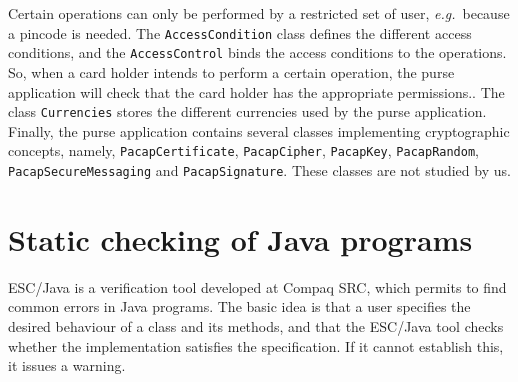 \documentclass[a4paper]{llncs}
\begin{document}

Certain operations can only be performed by a restricted set of user,
\emph{e.g.}~because a pincode is needed.
The \texttt{AccessCondition} class defines the different access
conditions, and the \texttt{AccessControl} binds the access conditions
to the operations. So, when a card holder intends to perform a certain
operation, the purse application will check that the card holder has
the appropriate permissions.. %
The class \texttt{Currencies} stores the different currencies used by
the purse application.  Finally, the purse application contains several classes
implementing cryptographic concepts, namely, \texttt{PacapCertificate},
\texttt{PacapCipher}, \texttt{PacapKey}, \texttt{PacapRandom},
\texttt{PacapSecureMessaging} and \texttt{PacapSignature}. These
classes are not studied by us.






\section{Static checking of Java programs}
\label{SectStatic}


\label{SubSectEscJava}

ESC/Java is a verification tool developed at Compaq SRC, which permits
to find common errors in Java programs. The basic idea is that a user
specifies the desired behaviour of a class and its methods, and that
the ESC/Java tool checks whether the implementation satisfies the
specification. If it cannot establish this, it issues a warning.
\end{document}
